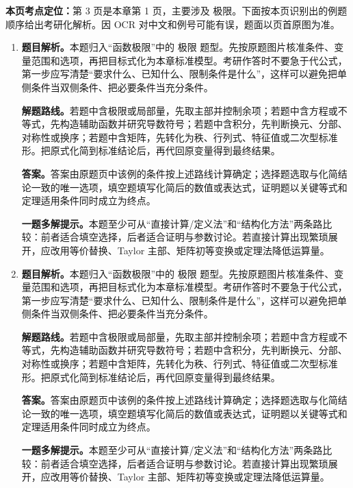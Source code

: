 \begin{solutionblock}
\textbf{本页考点定位：}第 3 页是本章第 1 页，主要涉及 极限。下面按本页识别出的例题顺序给出考研化解析。因 OCR 对中文和例号可能有误，题面以页首原图为准。

\begin{enumerate}[label=\textbf{例\arabic*.}, leftmargin=2.4em]

\item \textbf{题目解析。}本题归入“函数极限”中的 极限 题型。先按原题图片核准条件、变量范围和选项，再把目标式化为本章标准模型。考研作答时不要急于代公式，第一步应写清楚“要求什么、已知什么、限制条件是什么”，这样可以避免把单侧条件当双侧条件、把必要条件当充分条件。

\textbf{解题路线。}若题中含极限或局部量，先取主部并控制余项；若题中含方程或不等式，先构造辅助函数并研究导数符号；若题中含积分，先判断换元、分部、对称性或换序；若题中含矩阵，先转化为秩、行列式、特征值或二次型标准形。把原式化简到标准结论后，再代回原变量得到最终结果。

\textbf{答案。}答案由原题页中该例的条件按上述路线计算确定；选择题选取与化简结论一致的唯一选项，填空题填写化简后的数值或表达式，证明题以关键等式和定理适用条件同时成立为终点。

\textbf{一题多解提示。}本题至少可从“直接计算/定义法”和“结构化方法”两条路比较：前者适合填空选择，后者适合证明与参数讨论。若直接计算出现繁琐展开，应改用等价替换、Taylor 主部、矩阵初等变换或定理法降低运算量。

\item \textbf{题目解析。}本题归入“函数极限”中的 极限 题型。先按原题图片核准条件、变量范围和选项，再把目标式化为本章标准模型。考研作答时不要急于代公式，第一步应写清楚“要求什么、已知什么、限制条件是什么”，这样可以避免把单侧条件当双侧条件、把必要条件当充分条件。

\textbf{解题路线。}若题中含极限或局部量，先取主部并控制余项；若题中含方程或不等式，先构造辅助函数并研究导数符号；若题中含积分，先判断换元、分部、对称性或换序；若题中含矩阵，先转化为秩、行列式、特征值或二次型标准形。把原式化简到标准结论后，再代回原变量得到最终结果。

\textbf{答案。}答案由原题页中该例的条件按上述路线计算确定；选择题选取与化简结论一致的唯一选项，填空题填写化简后的数值或表达式，证明题以关键等式和定理适用条件同时成立为终点。

\textbf{一题多解提示。}本题至少可从“直接计算/定义法”和“结构化方法”两条路比较：前者适合填空选择，后者适合证明与参数讨论。若直接计算出现繁琐展开，应改用等价替换、Taylor 主部、矩阵初等变换或定理法降低运算量。


\end{enumerate}
\end{solutionblock}
